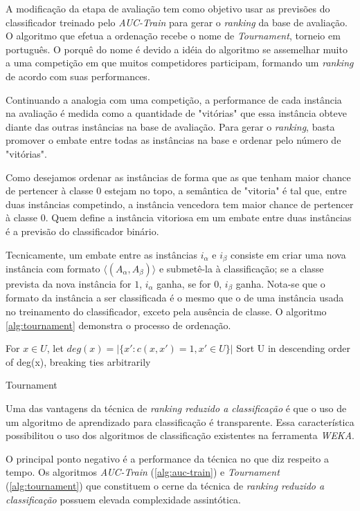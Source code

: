 A modificação da etapa de avaliação tem como objetivo usar as previsões do classificador treinado pelo \emph{AUC-Train} para gerar o \emph{ranking} da base de avaliação. O algoritmo que efetua a ordenação recebe o nome de \emph{Tournament}, torneio em português. O porquê do nome é devido a idéia do algoritmo se assemelhar muito a uma competição em que muitos competidores participam, formando um \emph{ranking} de acordo com suas performances.

Continuando a analogia com uma competição, a performance de cada instância na avaliação é medida como a quantidade de "vitórias" que essa instância obteve diante das outras instâncias na base de avaliação. Para gerar o \emph{ranking}, basta promover o embate entre todas as instâncias na base e ordenar pelo número de "vitórias".

Como desejamos ordenar as instâncias de forma que as que tenham maior chance de pertencer à classe $0$ estejam no topo, a semântica de "vitoria" é tal que, entre duas instâncias competindo, a instância vencedora tem maior chance de pertencer à classe $0$. Quem define a instância vitoriosa em um embate entre duas instâncias é a previsão do classificador binário.

Tecnicamente, um embate entre as instâncias $i_\alpha$ e $i_\beta$ consiste em criar uma nova instância com formato $\langle (A_\alpha, A_\beta)\rangle$ e submetê-la à classificação; se a classe prevista da nova instância for $1$, $i_\alpha$ ganha, se for $0$, $i_\beta$ ganha. Nota-se que o formato da instância a ser classificada é o mesmo que o de uma instância usada no treinamento do classificador, exceto pela ausência de classe. O algoritmo \ref{alg:tournament} demonstra o processo de ordenação.

\begin{algorithm}
    For $x \in U$, let $deg(x) = |\{x':c(x, x') = 1, x' \in U\}|$
    Sort U in descending order of deg(x), breaking ties arbitrarily
    
    \caption{Tournament}
    \label{alg:tournament}
\end{algorithm}

Uma das vantagens da técnica de \emph{ranking reduzido a classificação} é que o uso de um algoritmo de aprendizado para classificação é transparente. Essa característica possibilitou o uso dos algoritmos de classificação existentes na ferramenta \emph{WEKA}.

O principal ponto negativo é a performance da técnica no que diz respeito a tempo. Os algoritmos \emph{AUC-Train} (\ref{alg:auc-train}) e \emph{Tournament} (\ref{alg:tournament}) que constituem o cerne da técnica de \emph{ranking reduzido a classificação} possuem elevada complexidade assintótica.


